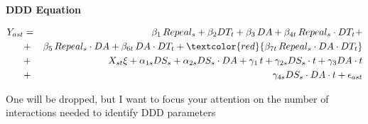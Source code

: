 \documentclass[notes=show]{beamer}
\begin{document}
\begin{frame}[plain]
\begin{center}
\textbf{DDD Equation}
\end{center}

\begin{eqnarray*}
	Y_{ast} &=& \beta_1\,Repeal_s + \beta_2DT_t +\beta_3\,DA+ \beta_{4t}\,Repeal_s\cdot DT_t   +  \nonumber \\
	        &+& \beta_5\,Repeal_s\cdot DA + \beta_{6t}\,DA\cdot DT_t + \textcolor{red}{\beta_{7t}\,Repeal_s\cdot DA \cdot DT_t}  \nonumber \\
                 &+& X_{st}\xi + \alpha_{1s}DS_s + \alpha_{2s}DS_s\cdot DA + \gamma_1\,t + \gamma_{2s}DS_s\cdot t + \gamma_3DA\cdot t \nonumber \\
                 &+&  \gamma_{4s}DS_s\cdot DA \cdot t + \epsilon_{ast}
\end{eqnarray*}

One will be dropped, but I want to focus your attention on the number of interactions needed to identify DDD parameters

\end{frame}
\end{document}
